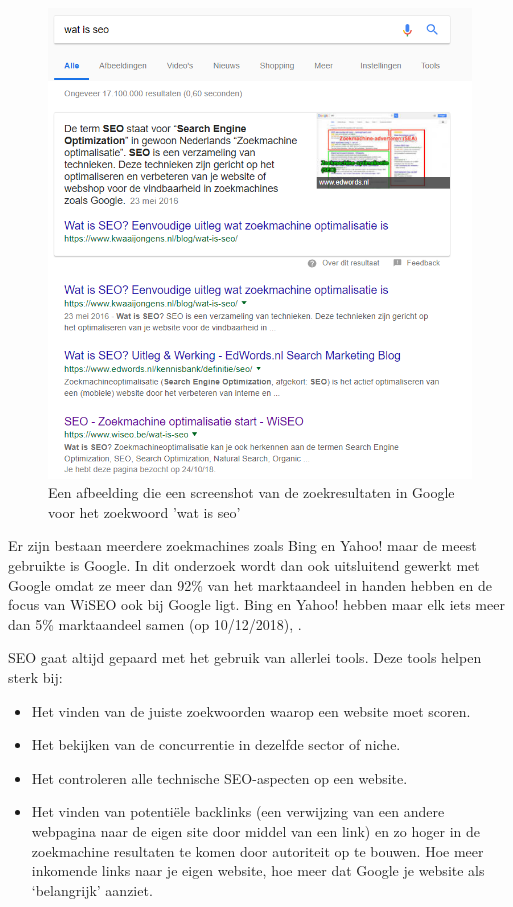 \begin{figure}[h!]
\centering
\includegraphics[width=\linewidth]{img/watisseo.png}
\caption{Een afbeelding die een screenshot van de zoekresultaten in Google voor het zoekwoord 'wat is seo' \autocite{google.be}}
\end{figure}

Er zijn bestaan meerdere zoekmachines zoals Bing en Yahoo! maar de meest gebruikte is Google. In dit onderzoek wordt dan ook uitsluitend gewerkt met Google omdat ze meer dan 92\% van het marktaandeel in handen hebben en de focus van WiSEO ook bij Google ligt. Bing en Yahoo! hebben maar elk iets meer dan 5\% marktaandeel samen (op 10/12/2018),          
\textcite{ZOEKMACHINES} .

SEO gaat altijd gepaard met het gebruik van allerlei tools. Deze tools helpen sterk bij: 
\begin{itemize}
\item Het vinden van de juiste zoekwoorden waarop een website moet scoren.
\item Het bekijken van de concurrentie in dezelfde sector of niche.
\item Het controleren alle technische SEO-aspecten op een website.
\item Het vinden van potentiële backlinks (een verwijzing van een andere webpagina naar de eigen site door middel van een link) en zo hoger in de zoekmachine resultaten te komen door autoriteit op te bouwen. Hoe meer inkomende links naar je eigen website, hoe meer dat Google je website als ‘belangrijk’ aanziet. 
\end{itemize}


